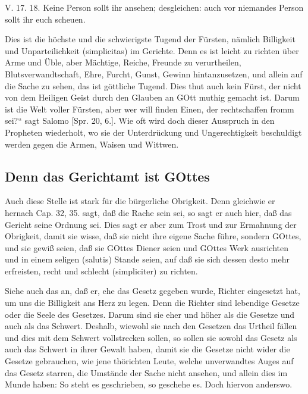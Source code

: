\begin{schriftzitat}
V. 17. 18. Keine Person sollt ihr ansehen; desgleichen: auch vor niemandes Person sollt ihr euch scheuen.
\end{schriftzitat}

Dies ist die höchste und die schwierigste Tugend der Fürsten, nämlich Billigkeit und Unparteilichkeit (simplicitas) im Gerichte. Denn es ist leicht zu richten über Arme und Üble,
aber Mächtige, Reiche, Freunde zu verurtheilen, Blutsverwandtschaft, Ehre, Furcht, Gunst, Gewinn hintanzusetzen, und allein auf die Sache zu sehen, das ist göttliche Tugend. Dies thut auch kein Fürst, der nicht von dem Heiligen Geist durch den Glauben an GOtt muthig gemacht ist. Darum ist die Welt voller Fürsten, aber wer will finden Einen, der rechtschaffen fromm sei?“ sagt Salomo [Spr. 20, 6.]. Wie oft wird doch dieser Ausspruch in den Propheten wiederholt, wo sie der Unterdrückung und Ungerechtigkeit beschuldigt werden gegen die Armen, Waisen und Wittwen.

\subsection{Denn das Gerichtamt ist GOttes}

Auch diese Stelle ist stark für die bürgerliche Obrigkeit. Denn gleichwie er hernach Cap. 32, 35. sagt, daß die Rache sein sei, so sagt er auch hier, daß das Gericht seine Ordnung sei. Dies sagt er aber zum Trost und zur Ermahnung der Obrigkeit, damit sie wisse, daß sie nicht ihre eigene Sache führe, sondern GOttes, und sie gewiß seien, daß sie GOttes Diener seien und GOttes Werk ausrichten und in einem seligen (salutis) Stande seien, auf daß sie sich dessen desto mehr erfreisten, recht und schlecht (simpliciter) zu richten.

Siehe auch das an, daß er, ehe das Gesetz gegeben wurde, Richter eingesetzt hat, um uns die Billigkeit ans Herz zu legen. Denn die Richter sind lebendige Gesetze oder die Seele des Gesetzes. Darum sind sie eher und höher als die Gesetze und auch als das Schwert. Deshalb, wiewohl sie nach den Gesetzen das Urtheil fällen und dies mit dem Schwert vollstrecken sollen, so sollen sie sowohl das Gesetz als auch das Schwert in ihrer Gewalt haben, damit sie die Gesetze nicht wider die Gesetze gebrauchen, wie jene thörichten Leute, welche unverwandtes Auges auf das Gesetz starren, die Umstände der Sache nicht ansehen, und allein dies im Munde haben: So steht es geschrieben, so geschehe es. Doch hiervon anderswo.

